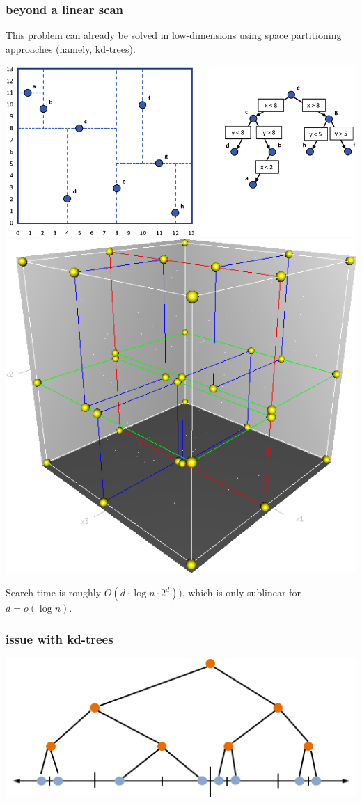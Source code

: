\documentclass[compress]{beamer}
\begin{document}
\begin{frame}
	\frametitle{beyond a linear scan}	
	This problem can already be solved in low-dimensions using space partitioning approaches (namely, kd-trees).
	
	\includegraphics[height=.4\textheight]{kdtree.png}	\includegraphics[height=.4\textheight]{3dtree.png}
	
	Search time is roughly $O(d\cdot  \log n \cdot 2^d))$, which is only sublinear for $d = o(\log n)$.
\end{frame}

\begin{frame}
	\frametitle{issue with kd-trees}	

	
	\includegraphics[width=\textwidth]{1d-kd_tree.png}	
\end{frame}
\end{document}
